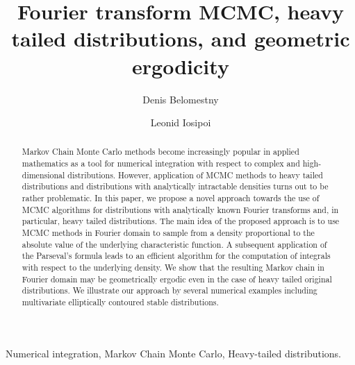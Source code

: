 \documentclass[preprint, 3p, authoryear]{elsarticle}
\theoremstyle{definition}
\begin{document}
\SetAlgoVlined%


\begin{frontmatter}



\title{Fourier transform MCMC, heavy tailed distributions, and geometric ergodicity}

\author[ude,hse]{Denis Belomestny}
\author[hse]{Leonid Iosipoi}
\address[ude]{Duisburg-Essen University, Germany} 
\address[hse]{National Research University Higher School of Economics, Russia}


\begin{abstract}
Markov Chain Monte Carlo methods become increasingly popular in applied mathematics as a tool for numerical integration with respect to complex and high-dimensional distributions.  However, application of   MCMC methods to heavy tailed distributions and distributions with analytically intractable densities turns out to be rather problematic. In this paper, we propose a novel approach towards the use of MCMC algorithms for distributions with analytically known Fourier transforms and, in particular, heavy tailed distributions. The main idea of the proposed approach is to use MCMC methods in Fourier domain to sample from a density proportional to the absolute value of the underlying characteristic function. 
A subsequent application of the Parseval's formula leads to an efficient algorithm for the computation of integrals with respect to the underlying density.
We show that the resulting Markov chain in  Fourier domain may be geometrically ergodic  even in the case of heavy tailed original distributions.   
We illustrate our approach by several numerical examples including multivariate elliptically contoured stable distributions.
\end{abstract}

\begin{keyword}
Numerical integration, Markov Chain Monte Carlo, Heavy-tailed distributions. %
\end{keyword}

\end{frontmatter}
\end{document}
